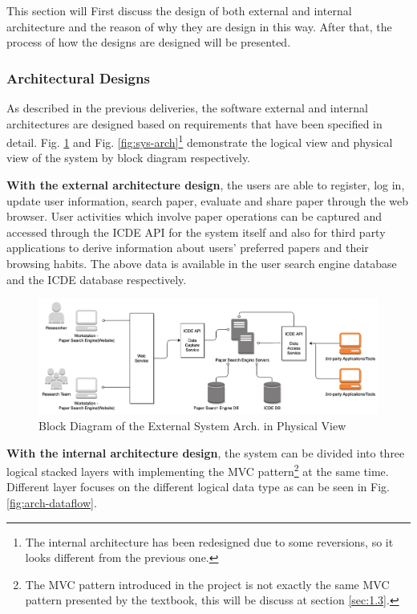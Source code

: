 \documentclass[conference]{IEEEtran}
\begin{document}
This section will First discuss the design of both external and internal architecture and the reason of why they are design in this way.
After that, the process of how the designs are designed will be presented.

\subsubsection{\textbf{Architectural Designs}}
\label{sec:1.1.1}

As described in the previous deliveries, the software external and internal architectures are designed based on requirements that have been specified in detail.
Fig. \ref{fig:sys-context} and  Fig. \ref{fig:sys-arch}\footnote{The internal architecture has been redesigned due to some reversions, so it looks different from the previous one.}
demonstrate the logical view and physical view of the system by block diagram respectively.

\textbf{With the external architecture design}, the users are able to register, log in, update user information, search paper, evaluate and share paper through the web browser.
User activities which involve paper operations can be captured and accessed through the ICDE API for the system itself
and also for third party applications to derive information about users' preferred papers and their browsing habits.
The above data is available in the user search engine database and the ICDE database respectively.

\begin{figure}[!ht]
	\centering
	\includegraphics[scale=0.06]{sys-context.png}
	\caption{Block Diagram of the External System Arch. in Physical View}
	\label{fig:sys-context}
\end{figure}

\textbf{With the internal architecture design}, the system can be divided into three logical stacked layers
with implementing the MVC pattern\footnote{The MVC pattern introduced in the project is not exactly the same MVC pattern presented by the textbook\cite{textbook}, this will be discuss at section \ref{sec:1.3}.} at the same time.
Different layer focuses on the different logical data type as can be seen in Fig. \ref{fig:arch-dataflow}.
\end{document}
